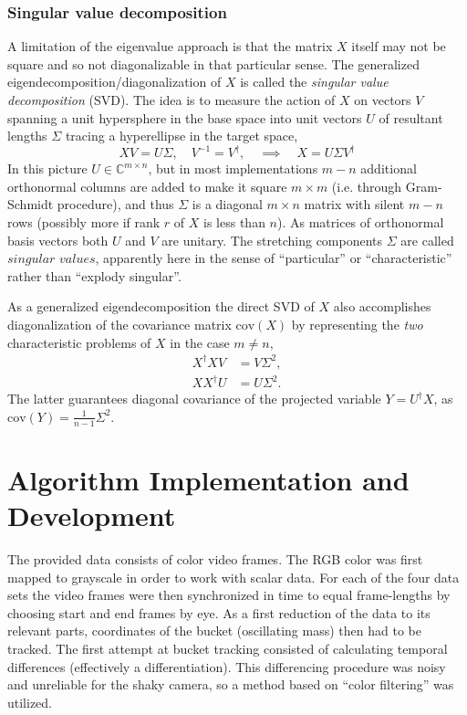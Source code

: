 \documentclass{article}
\begin{document}
\subsubsection{Singular value decomposition}
A limitation of the eigenvalue approach is that the matrix $X$ itself may not be square and so not diagonalizable in that particular sense. The generalized eigendecomposition/diagonalization of $X$ is called the \textit{singular value decomposition} (SVD). The idea is to measure the action of $X$ on vectors $V$ spanning a unit hypersphere in the base space into unit vectors $U$ of resultant lengths $\Sigma$ tracing a hyperellipse in the target space,
\begin{equation}
  XV = U\Sigma,\quad V^{-1} = V^\dagger,\quad\implies\quad X = U\Sigma V^\dagger
\end{equation}
In this picture $U\in\mathbb{C}^{m\times n}$, but in most implementations $m-n$ additional orthonormal columns are added to make it square $m\times m$ (i.e. through Gram-Schmidt procedure), and thus $\Sigma$ is a diagonal $m\times n$ matrix with silent $m-n$ rows (possibly more if rank $r$ of $X$ is less than $n$). As matrices of orthonormal basis vectors both $U$ and $V$ are unitary. The stretching components $\Sigma$ are called $\textit{singular values}$, apparently here in the sense of ``particular'' or ``characteristic'' rather than ``explody singular''.

As a generalized eigendecomposition the direct SVD of $X$ also accomplishes diagonalization of the covariance matrix $\text{cov}(X)$ by representing the \textit{two} characteristic problems of $X$ in the case $m\neq n$, \cite{kutz}
\begin{align}
  X^\dagger XV &= V\Sigma^2,\\
  XX^\dagger U &= U\Sigma^2.
\end{align}
The latter guarantees diagonal covariance of the projected variable $Y = U^\dagger X$, as $\text{cov}(Y) = \frac{1}{n-1}\Sigma^2$.

\section{Algorithm Implementation and Development}\label{section}
The provided data consists of color video frames. The RGB color was first mapped to grayscale in order to work with scalar data. For each of the four data sets the video frames were then synchronized in time to equal frame-lengths by choosing start and end frames by eye. As a first reduction of the data to its relevant parts, coordinates of the bucket (oscillating mass) then had to be tracked. The first attempt at bucket tracking consisted of calculating temporal differences (effectively a differentiation). This differencing procedure was noisy and unreliable for the shaky camera, so a method based on ``color filtering'' was utilized.
\end{document}
